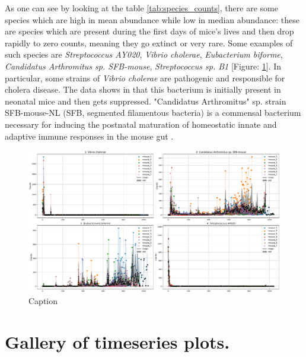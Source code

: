 As one can see by looking at the table \ref{tab:species_counts}, there are some species which are high in mean abundance while low in median abundance: these are species which are present during the first days of mice's lives and then drop rapidly to zero counts, meaning they go extinct or very rare. Some examples of such species are \textit{Streptococcus AY020}, \textit{Vibrio cholerae}, \textit{Eubacterium biforme}, \textit{Candidatus Arthromitus sp. SFB-mouse}, \textit{Streptococcus sp. B1} [Figure: \ref{fig:rare_species}]. In particular, some strains of \textit{Vibrio cholerae} are pathogenic and responsible for cholera disease. The data shows in that this bacterium is initially present in neonatal mice and then gets suppressed.  "Candidatus Arthromitus" sp. strain SFB-mouse-NL (SFB, segmented filamentous bacteria) is a commensal bacterium necessary for inducing the postnatal maturation of homeostatic innate and adaptive immune responses in the mouse gut \parencite{candidatus_arthromitus}.

\begin{figure}[H]
    \centering
    \includegraphics[width=\linewidth]{tables/chapter_2/rare_mean_species.pdf}
    \caption{Caption}
    \label{fig:rare_species}
\end{figure}
\newpage
\section{Gallery of timeseries plots.}


